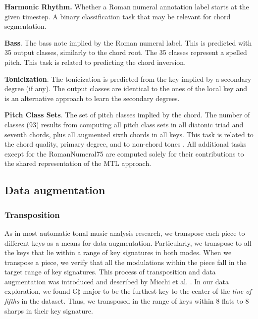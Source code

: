 \textbf{Harmonic Rhythm.} Whether a Roman numeral annotation label starts at the given timestep. A binary classification task that may be relevant for chord segmentation.

\textbf{Bass}. The bass note implied by the Roman numeral label. This is predicted with 35 output classes, similarly to the chord root. The 35 classes represent a spelled pitch. This task is related to predicting the chord inversion.

\textbf{Tonicization}. The tonicization is predicted from the key implied by a secondary degree (if any). 
The output classes are identical to the ones of the local key and is an alternative approach to learn the secondary degrees.

\textbf{Pitch Class Sets}. The set of pitch classes implied by the chord. The number of classes (93) results from computing all pitch class sets in all diatonic triad and seventh chords, plus all augmented sixth chords in all keys. This task is related to the chord quality, primary degree, and to non-chord tones \cite{ju_non-chord_2017}.
All additional tasks except for the RomanNumeral75 are computed solely for their contributions to the shared representation of the MTL approach.

\subsection{Data augmentation}

\subsubsection{Transposition}

As in most automatic tonal music analysis research, we transpose each piece to different keys as a means for data augmentation. 
Particularly, we transpose to all the keys that lie within a range of key signatures in both modes.
When we transpose a piece, we verify that all the modulations within the piece fall in the target range of key signatures.
This process of transposition and data augmentation was introduced and described by Micchi et al. \cite{micchi_not_2020}.
In our data exploration, we found G$\sharp$ major to be the furthest key to the center of the \emph{line-of-fifths} \cite{temperley_line_2000} in the dataset. 
Thus, we transposed in the range of keys within 8 flats to 8 sharps in their key signature.

